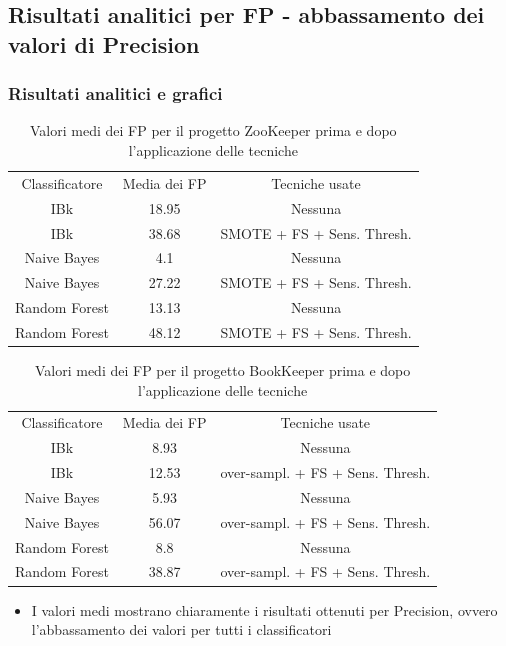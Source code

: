 \documentclass[10pt]{beamer}
\begin{document}
\begin{frame}
\section{Risultati analitici per FP - abbassamento dei valori di Precision}
\frametitle{Risultati analitici e grafici}
\begin{table}
\begin{tabular}{|c|c|c|}
\hline
Classificatore & Media dei FP & Tecniche usate\\
IBk & 18.95 & Nessuna\\
IBk & 38.68 & SMOTE + FS + Sens. Thresh.\\
\hline
Naive Bayes & 4.1 & Nessuna \\
Naive Bayes & 27.22 & SMOTE + FS + Sens. Thresh.\\
\hline
Random Forest & 13.13 & Nessuna \\
Random Forest & 48.12 & SMOTE + FS + Sens. Thresh.\\
\hline
\end{tabular}
\caption{Valori medi dei FP per il progetto ZooKeeper prima e dopo l'applicazione delle tecniche}
\end{table}

\begin{table}
\begin{tabular}{|c|c|c|}
\hline
Classificatore & Media dei FP & Tecniche usate\\
IBk & 8.93 & Nessuna\\
IBk & 12.53 & over-sampl. + FS + Sens. Thresh.\\
\hline
Naive Bayes & 5.93 & Nessuna \\
Naive Bayes & 56.07 & over-sampl. + FS + Sens. Thresh.\\
\hline
Random Forest & 8.8 & Nessuna \\
Random Forest & 38.87 & over-sampl. + FS + Sens. Thresh.\\
\hline
\end{tabular}
\caption{Valori medi dei FP per il progetto BookKeeper prima e dopo l'applicazione delle tecniche}
\end{table}
\begin{itemize}
\item I valori medi mostrano chiaramente i risultati ottenuti per Precision, ovvero l'abbassamento dei valori per tutti i classificatori
\end{itemize}
\end{frame}
\end{document}
